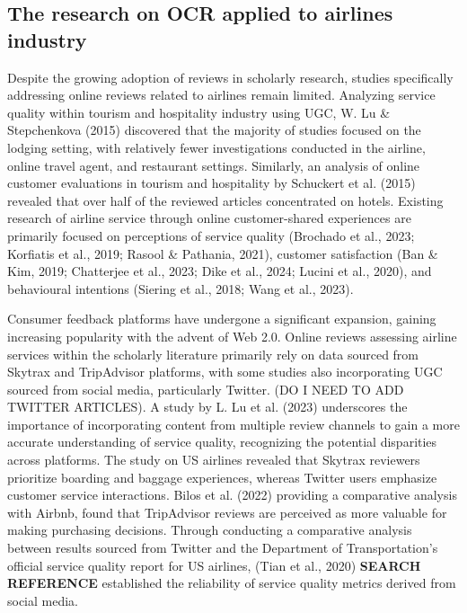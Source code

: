 \documentclass[
]{agujournal2019}
\begin{document}
\subsection{The research on OCR applied to airlines
industry}\label{the-research-on-ocr-applied-to-airlines-industry}

Despite the growing adoption of reviews in scholarly research, studies
specifically addressing online reviews related to airlines remain
limited. Analyzing service quality within tourism and hospitality
industry using UGC, W. Lu \& Stepchenkova (2015) discovered that the
majority of studies focused on the lodging setting, with relatively
fewer investigations conducted in the airline, online travel agent, and
restaurant settings. Similarly, an analysis of online customer
evaluations in tourism and hospitality by Schuckert et al. (2015)
revealed that over half of the reviewed articles concentrated on hotels.
Existing research of airline service through online customer-shared
experiences are primarily focused on perceptions of service quality
(Brochado et al., 2023; Korfiatis et al., 2019; Rasool \& Pathania,
2021), customer satisfaction (Ban \& Kim, 2019; Chatterjee et al., 2023;
Dike et al., 2024; Lucini et al., 2020), and behavioural intentions
(Siering et al., 2018; Wang et al., 2023).

Consumer feedback platforms have undergone a significant expansion,
gaining increasing popularity with the advent of Web 2.0. Online reviews
assessing airline services within the scholarly literature primarily
rely on data sourced from Skytrax and TripAdvisor platforms, with some
studies also incorporating UGC sourced from social media, particularly
Twitter. (DO I NEED TO ADD TWITTER ARTICLES). A study by L. Lu et al.
(2023) underscores the importance of incorporating content from multiple
review channels to gain a more accurate understanding of service
quality, recognizing the potential disparities across platforms. The
study on US airlines revealed that Skytrax reviewers prioritize boarding
and baggage experiences, whereas Twitter users emphasize customer
service interactions. Bilos et al. (2022) providing a comparative
analysis with Airbnb, found that TripAdvisor reviews are perceived as
more valuable for making purchasing decisions. Through conducting a
comparative analysis between results sourced from Twitter and the
Department of Transportation's official service quality report for US
airlines, (Tian et al., 2020) \textbf{SEARCH REFERENCE} established the
reliability of service quality metrics derived from social media.
\end{document}
